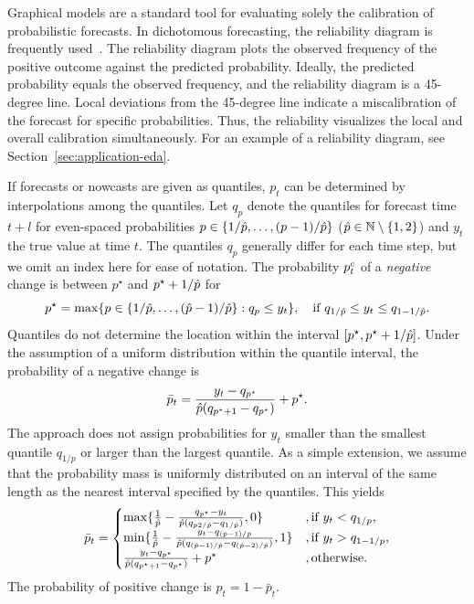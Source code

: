 Graphical models are a standard tool for evaluating solely the calibration of probabilistic forecasts.
In dichotomous forecasting, the reliability diagram is frequently used~\parencite{Ranjan2010}.
The reliability diagram plots the observed frequency of the positive outcome against the predicted probability.
Ideally, the predicted probability equals the observed frequency, and the reliability diagram is a 45-degree line.
Local deviations from the 45-degree line indicate a miscalibration of the forecast for specific probabilities.
Thus, the reliability visualizes the local and overall calibration simultaneously.
For an example of a reliability diagram, see Section~\ref{sec:application-eda}.

If forecasts or nowcasts are given as quantiles, $p_t$ can be determined by interpolations among the quantiles.
Let $q_p$ denote the quantiles for forecast time $t+l$ for even-spaced probabilities $p \in \{1/\hat{p}, \dots, (p-1) / \hat{p}\}$ ($\hat{p} \in \mathbb{N} \setminus \{1, 2\}$) and $y_t$ the true value at time $t$. 
The quantiles $q_p$ generally differ for each time step, but we omit an index here for ease of notation.
The probability $p^c_t$ of a \textit{negative} change is between $p^{\star}$ and $p^{\star} + 1/\hat{p}$ for
\begin{equation*}
    p^{\star} = \max \{p \in \{1/\hat{p}, \dots, (\hat{p}-1) / \hat{p}\}: q_p \leq y_t\} , \quad \text{if}\ q_{1/\hat{p}} \leq y_t \leq q_{1 - 1/\hat{p}}.
\end{equation*}
Quantiles do not determine the location within the interval $[p^{\star}, p^{\star} + 1/\hat{p}]$.
Under the assumption of a uniform distribution within the quantile interval, the probability of a negative change is
\begin{equation*}
    \bar{p}_t = \frac{y_t - q_{p^\star}}{\hat{p} (q_{p^{\star} + 1} - q_{p^{\star}})} + p^{\star}.
\end{equation*}
The approach does not assign probabilities for $y_t$ smaller than the smallest quantile $q_{1/p}$ or larger than the largest quantile.
As a simple extension, we assume that the probability mass is uniformly distributed on an interval of the same length as the nearest interval specified by the quantiles.
This yields
\begin{equation*}
\bar{p}_t = \begin{cases}
    \max \{\frac{1}{\hat{p}} - \frac{q_{p^\star} - y_t}{\hat{p} (q_{p2/\hat{p}} - q_{1/\hat{p}})}, 0\} &, \text{if } y_t < q_{1/p}, \\
    \min \{\frac{1}{\hat{p}} - \frac{y_t - q_{(\hat{p}-1)/\hat{p}}}{\hat{p} (q_{(\hat{p}-1)/\hat{p}} - q_{(\hat{p}-2)/\hat{p}})}, 1\} &, \text{if } y_t > q_{1 - 1/p}, \\
    \frac{y_t - q_{p^\star}}{\hat{p} (q_{p^{\star} + 1} - q_{p^{\star}})} + p^{\star} &, \text{otherwise.}
\end{cases}
\end{equation*}
The probability of positive change is $p_t = 1 - \bar{p}_t$.

